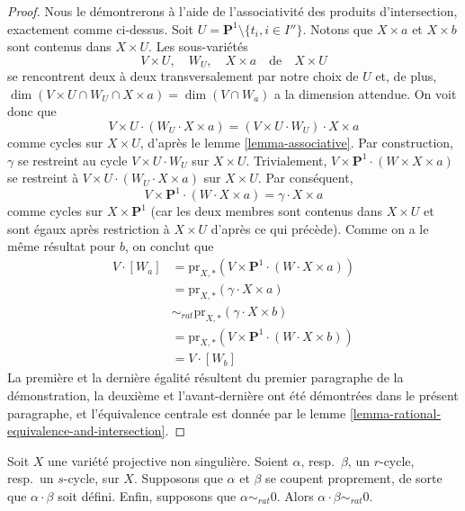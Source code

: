 \begin{proof}
\medskip\noindent
Nous le démontrerons à l'aide de l'associativité des produits d'intersection, exactement
comme ci-dessus. Soit $U = \mathbf{P}^1 \setminus \{t_i, i \in I''\}$.
Notons que $X \times a$ et $X \times b$ sont contenus dans $X \times U$.
Les sous-variétés
$$
V \times U,\quad W_U,\quad X \times a\quad\text{de}\quad X \times U
$$
se rencontrent deux à deux transversalement par notre choix de $U$ et, de plus,
$\dim(V \times U \cap W_U \cap X \times a) = \dim(V \cap W_a)$ a
la dimension attendue. On voit donc que
$$
V \times U \cdot (W_U \cdot X \times a) =
(V \times U \cdot W_U) \cdot X \times a
$$
comme cycles sur $X \times U$, d'après le lemme \ref{lemma-associative}.
Par construction, $\gamma$ se restreint au cycle $V \times U \cdot W_U$
sur $X \times U$. Trivialement,
$V \times \mathbf{P}^1 \cdot (W \times X \times a)$ se restreint
à $V \times U \cdot (W_U \cdot X \times a)$ sur $X \times U$.
Par conséquent,
$$
V \times \mathbf{P}^1 \cdot (W \cdot X \times a) =
\gamma \cdot X \times a
$$
comme cycles sur $X \times \mathbf{P}^1$ (car les deux membres
sont contenus dans $X \times U$ et sont égaux après restriction
à $X \times U$ d'après ce qui précède). Comme on a le même résultat pour $b$,
on conclut que
\begin{align*}
V \cdot [W_a]
& =
\text{pr}_{X,*}(V \times \mathbf{P}^1 \cdot (W \cdot X\times a)) \\
& =
\text{pr}_{X, *}(\gamma \cdot X \times a) \\
& \sim_{rat} 
\text{pr}_{X, *}(\gamma \cdot X \times b) \\
& =
\text{pr}_{X,*}(V \times \mathbf{P}^1 \cdot (W \cdot X\times b)) \\
& =
V \cdot [W_b]
\end{align*}
La première et la dernière égalité résultent du premier paragraphe de la démonstration,
la deuxième et l'avant-dernière ont été démontrées dans le présent paragraphe, et
l'équivalence centrale est donnée par le
lemme \ref{lemma-rational-equivalence-and-intersection}.
\end{proof}

\begin{theorem}
\label{theorem-well-defined}
Soit $X$ une variété projective non singulière. Soient $\alpha$, resp.\ $\beta$,
un $r$-cycle, resp.\ un $s$-cycle, sur $X$. Supposons que $\alpha$ et $\beta$
se coupent proprement, de sorte que $\alpha \cdot \beta$ soit défini. Enfin,
supposons que $\alpha \sim_{rat} 0$. Alors $\alpha \cdot \beta \sim_{rat} 0$.
\end{theorem}

